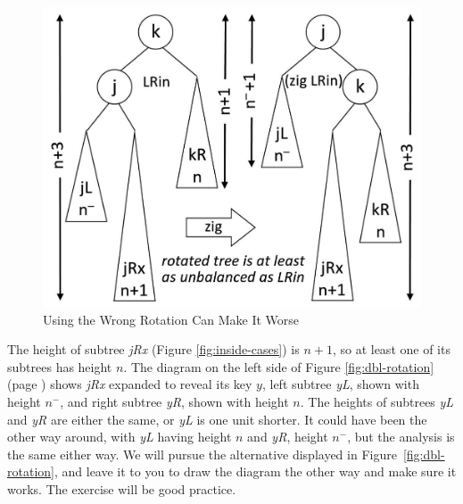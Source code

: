 \begin{figure}
\begin{center}
\includegraphics[scale=1]{images-cmyk/badzig}
\end{center}
\caption{Using the Wrong Rotation Can Make It Worse}
\label{fig:badzig}
\end{figure}

The height of subtree \emph{jRx}
(Figure \ref{fig:inside-cases}) is $n+1$,
so at least one of its subtrees has height $n$.
The diagram on the left side of
Figure \ref{fig:dbl-rotation} (page \pageref{fig:dbl-rotation})
shows \emph{jRx} expanded to reveal its key $y$,
left subtree \emph{yL}, shown with height $n^-$,
and right subtree \emph{yR}, shown with height $n$.
The heights of subtrees \emph{yL} and \emph{yR} are either the same,
or \emph{yL} is one unit shorter. It could
have been the other way around, with
\emph{yL} having height $n$ and \emph{yR}, height $n^-$,
but the analysis is the same either way.
We will pursue the alternative
displayed in Figure~\ref{fig:dbl-rotation},
and leave it to you to draw the diagram the other way
and make sure it works. The exercise will be good practice.

